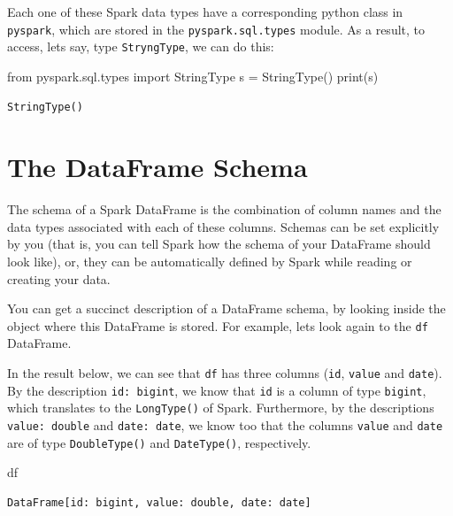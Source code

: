 \documentclass[
  11pt,
  letterpaper,
  DIV=11,
  numbers=noendperiod]{scrreprt}
\newenvironment{Shaded}{\begin{snugshade}}{\end{snugshade}}
\newcommand{\BuiltInTok}[1]{\textcolor[rgb]{0.00,0.23,0.31}{#1}}
\newcommand{\ImportTok}[1]{\textcolor[rgb]{0.00,0.46,0.62}{#1}}
\newcommand{\NormalTok}[1]{\textcolor[rgb]{0.00,0.23,0.31}{#1}}
\newcommand{\OperatorTok}[1]{\textcolor[rgb]{0.37,0.37,0.37}{#1}}
\begin{document}
Each one of these Spark data types have a corresponding python class in
\texttt{pyspark}, which are stored in the \texttt{pyspark.sql.types}
module. As a result, to access, lets say, type \texttt{StryngType}, we
can do this:

\begin{Shaded}
\begin{Highlighting}[]
\ImportTok{from}\NormalTok{ pyspark.sql.types }\ImportTok{import}\NormalTok{ StringType}
\NormalTok{s }\OperatorTok{=}\NormalTok{ StringType()}
\BuiltInTok{print}\NormalTok{(s)}
\end{Highlighting}
\end{Shaded}

\begin{verbatim}
StringType()
\end{verbatim}

\section{The DataFrame Schema}\label{sec-dataframe-schema}

The schema of a Spark DataFrame is the combination of column names and
the data types associated with each of these columns. Schemas can be set
explicitly by you (that is, you can tell Spark how the schema of your
DataFrame should look like), or, they can be automatically defined by
Spark while reading or creating your data.

You can get a succinct description of a DataFrame schema, by looking
inside the object where this DataFrame is stored. For example, lets look
again to the \texttt{df} DataFrame.

In the result below, we can see that \texttt{df} has three columns
(\texttt{id}, \texttt{value} and \texttt{date}). By the description
\texttt{id:\ bigint}, we know that \texttt{id} is a column of type
\texttt{bigint}, which translates to the \texttt{LongType()} of Spark.
Furthermore, by the descriptions \texttt{value:\ double} and
\texttt{date:\ date}, we know too that the columns \texttt{value} and
\texttt{date} are of type \texttt{DoubleType()} and \texttt{DateType()},
respectively.

\begin{Shaded}
\begin{Highlighting}[]
\NormalTok{df}
\end{Highlighting}
\end{Shaded}

\begin{verbatim}
DataFrame[id: bigint, value: double, date: date]
\end{verbatim}
\end{document}
